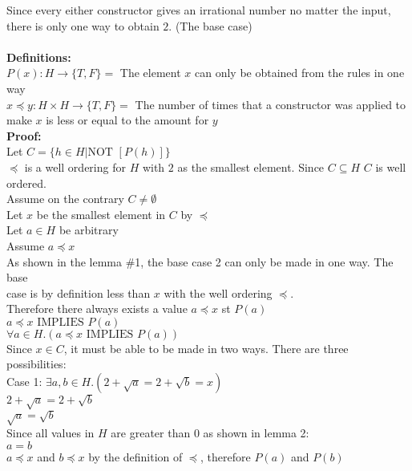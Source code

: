 \documentclass[11pt]{article}
\newcommand{\Implies}{\mbox{ IMPLIES }}
\newcommand{\Not}{\mbox{NOT }}
\begin{document}
\begin{enumerate}
\begin{solution}
Since every either constructor gives an irrational number no matter the input, there is only one way to obtain $2$. (The base case)\\\\
{\bf Definitions:}\\
$P(x): H\rightarrow \{T,F\} = $ The element $x$ can only be obtained from the rules in one way\\
$x\preccurlyeq y: H\times H \rightarrow \{T,F\} =$ The number of times that a constructor was applied to make $x$ is less or equal to the amount for $y$ \\
{\bf Proof:}\\
Let $C =\{h\in H|\Not [P(h)]\}$\\
$\preccurlyeq$ is a well ordering for $H$ with $2$ as the smallest element. Since $C\subseteq H$ $C$ is well ordered.\\
\null\quad Assume on the contrary $C\ne\emptyset$ \\
\null\quad Let $x$ be the smallest element in $C$ by $\preccurlyeq$\\
\null\quad\quad Let $a\in H$ be arbitrary\\
\null\qquad\quad Assume $a\preccurlyeq x$\\
\null\qquad\quad As shown in the lemma \#1, the base case 2 can only be made in one way. The base \\
\null\qquad\quad case is by definition less than $x$ with the well ordering $\preccurlyeq$. \\
\null\qquad\quad Therefore there always exists a value $a\preccurlyeq x$ st $P(a)$\\
\null\quad\quad $a\preccurlyeq x\Implies P(a)$\\
\null\quad $\forall a\in H.(a\preccurlyeq x\Implies P(a))$\\
\null\quad Since $x\in C$, it must be able to be made in two ways. There are three possibilities:  \\
\null\qquad Case 1: $\exists a,b\in H.(2+\sqrt a = 2+\sqrt b = x)$\\
\null\qquad $2+\sqrt a = 2+\sqrt b$\\
\null\qquad $\sqrt a = \sqrt b$\\
\null\qquad Since all values in $H$ are greater than $0$ as shown in lemma 2:\\
\null\qquad $a = b$\\
\null\qquad $a\preccurlyeq x$ and $b\preccurlyeq x$ by the definition of $\preccurlyeq$, therefore $P(a)$ and $P(b)$\\

\end{solution}
\end{enumerate}
\end{document}
